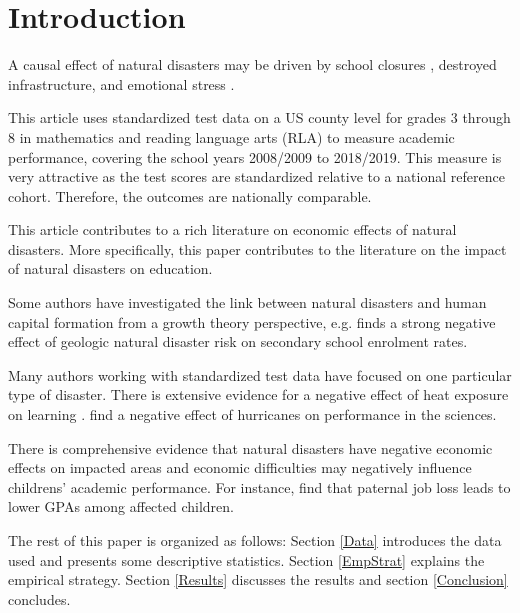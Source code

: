 
\section{Introduction}


A causal effect of natural disasters may be driven by school closures \citep{Grewening_2020}, destroyed infrastructure, and emotional stress \citep{Vogel_2016}. 

This article uses standardized test data on a US county level for grades 3 through 8 in mathematics and reading language arts (RLA) to measure academic performance, covering the school years 2008/2009 to 2018/2019. This measure is very attractive as the test scores are standardized relative to a national reference cohort. Therefore, the outcomes are nationally comparable.

This article contributes to a rich literature on economic effects of natural disasters. More specifically, this paper contributes to the literature on the impact of natural disasters on education.

Some authors have investigated the link between natural disasters and human capital formation from a growth theory perspective, e.g. \cite{Cuaresma_2010} finds a strong negative effect of geologic natural disaster risk on secondary school enrolment rates. 

Many authors working with standardized test data have focused on one particular type of disaster. There is extensive evidence for a negative effect of heat exposure on learning \cite[e.g.][]{Goodman_2020, Park_2020}. \cite{Spencer_2016} find a negative effect of hurricanes on performance in the sciences.

There is comprehensive evidence that natural disasters have negative economic effects on impacted areas \citep[e.g.][]{Deryugina_2017, Deryugina_2018} and economic difficulties may negatively influence childrens' academic performance. For instance, \cite{Rege_2011} find that paternal job loss leads to lower GPAs among affected children.

The rest of this paper is organized as follows: Section \ref{Data} introduces the data used and presents some descriptive statistics. Section \ref{EmpStrat} explains the empirical strategy. Section \ref{Results} discusses the results and section \ref{Conclusion} concludes.

